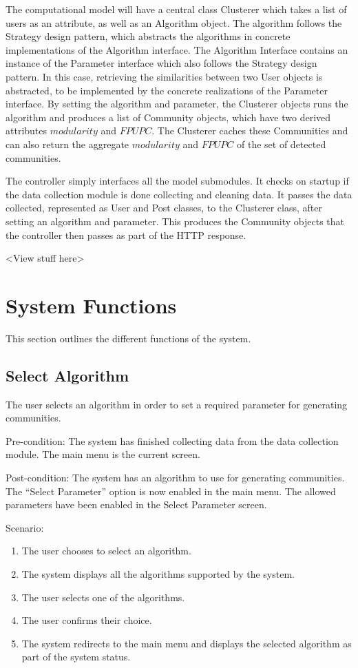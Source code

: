 The computational model will have a central class Clusterer which takes a list of users as an attribute, 
as well as an Algorithm object. The algorithm follows the Strategy design pattern, which abstracts the algorithms in
concrete implementations of the Algorithm interface. The Algorithm Interface contains an instance of the Parameter interface
which also follows the Strategy design pattern. In this case, retrieving the similarities between two User objects is abstracted,
to be implemented by the concrete realizations of the Parameter interface. By setting the algorithm and parameter, the Clusterer objects 
runs the algorithm and produces a list of Community objects, which have two derived attributes $modularity$ and $FPUPC$. The Clusterer caches
these Communities and can also return the aggregate $modularity$ and $FPUPC$ of the set of detected communities.

The controller simply interfaces all the model submodules. It checks on startup if the data collection module is done collecting and cleaning data. It passes the data collected, represented as User and Post classes, to the Clusterer class, after setting an algorithm and parameter. This produces the Community objects that the controller then passes as part of the HTTP response.

\textless View stuff here\textgreater

\section{System Functions}

This section outlines the different functions of the system.

\subsection{Select Algorithm}

The user selects an algorithm in order to set a required parameter for generating communities.

Pre-condition: The system has finished collecting data from the data collection module. 
The main menu is the current screen.

Post-condition: The system has an algorithm to use for generating communities. The ``Select Parameter'' option
is now enabled in the main menu. The allowed parameters have been enabled in the Select Parameter screen.

Scenario:
\begin{enumerate}
	\item The user chooses to select an algorithm.
	\item The system displays all the algorithms supported by the system.
	\item The user selects one of the algorithms.
	\item The user confirms their choice.
	\item The system redirects to the main menu and displays the selected algorithm as part of the system status.
\end{enumerate}

